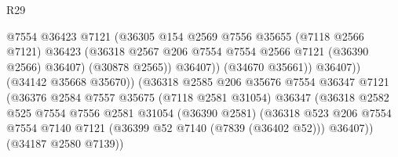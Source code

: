 \begin{lexlean}{R29}
\begin{coremodule}
                                          @7554
                                          @36423
                                          @7121
                                          (@36305
                                            @154
                                            @2569
                                            @7556
                                            @35655
                                            (@7118 @2566 @7121)
                                            @36423
                                            (@36318
                                              @2567
                                              @206
                                              @7554
                                              @7554
                                              @2566
                                              @7121
                                              (@36390 @2566)
                                              @36407)
                                            (@30878 @2565))
                                          @36407))
                                      (@34670 @35661))
                                    @36407))
                                (@34142 @35668 @35670))
                              (@36318
                                @2585
                                @206
                                @35676
                                @7554
                                @36347
                                @7121
                                (@36376
                                  @2584
                                  @7557
                                  @35675
                                  (@7118 @2581 @31054)
                                  @36347
                                  (@36318
                                    @2582
                                    @525
                                    @7554
                                    @7556
                                    @2581
                                    @31054
                                    (@36390 @2581)
                                    (@36318
                                      @523
                                      @206
                                      @7554
                                      @7554
                                      @7140
                                      @7121
                                      (@36399 @52 @7140 (@7839 (@36402 @52)))
                                      @36407))
                                  (@34187 @2580 @7139))

\end{coremodule}
\end{lexlean}
